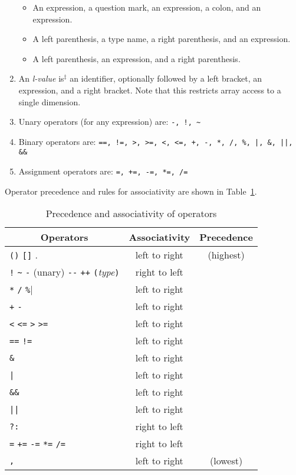 \documentclass{article}
\newcommand{\isextra}{is$^\ddagger$ }
\begin{document}
\begin{enumerate}
\begin{itemize}
    \item An expression, a question mark, an expression, a colon,
    and an expression.

    \item A left parenthesis, a type name, a right parenthesis, and
    an expression.
    \item A left parenthesis, an expression, and a right parenthesis.
  \end{itemize}

\item \label{lvalue}
  An \emph{l-value} \isextra an identifier,
  optionally followed by a left bracket,
  an expression, and a right bracket.
  Note that this restricts array access to a single dimension.

\item
  Unary operators (for any expression) are: \verb|-, !, ~|

\item
  Binary operators are: \verb$==, !=, >, >=, <, <=, +, -, *, /, %, |, &, ||, &&$

\item
  Assignment operators are: \verb$=, +=, -=, *=, /=$
\end{enumerate}
%
%
Operator precedence and rules for associativity
are shown in Table~\ref{TAB:precedence}.
%
\begin{table}[t]
\begin{center}
\begin{tabular}{@{}l|c|c}
\hline
  \multicolumn{1}{c|}{\sc Operators}
&
  {\sc Associativity}
&
  {\sc Precedence}
\\ \hline
  \verb|()| \quad \verb|[]| \quad .
  &
  left to right
  &
  (highest)
\\
  \verb|!| \quad \verb|~| \quad \verb|-| (unary)
  \quad \verb|--| \quad \verb|++|
  \quad \verb|(|\emph{type}\verb|)|
  &
  right to left
\\
  \verb|*| \quad \verb|/| \quad \verb|%|
  &
  left to right
\\
  \verb|+| \quad \verb|-|
  &
  left to right
\\
  \verb|<| \quad \verb|<=| \quad \verb|>| \quad \verb|>=|
  &
  left to right
\\
  \verb|==| \quad \verb|!=|
  &
  left to right
\\
  \verb|&|
  &
  left to right
\\
  \verb$|$
  &
  left to right
\\
  \verb|&&|
  &
  left to right
\\
  \verb$||$
  &
  left to right
\\
  \verb$?:$
  &
  right to left
\\
  \verb|=| \quad \verb|+=| \quad \verb|-=| \quad \verb|*=| \quad \verb|/=|
  &
  right to left
\\
  \verb|,|
  &
  left to right
  &
  (lowest)
\\ \hline
\end{tabular}
\end{center}
\caption{Precedence and associativity of operators}
\label{TAB:precedence}
\end{table}
\end{document}
